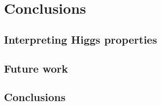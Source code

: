 \chapter{Conclusions}
\label{sec:Conclusions}

\section{Interpreting Higgs properties}

\section{Future work}

\section{Conclusions}




